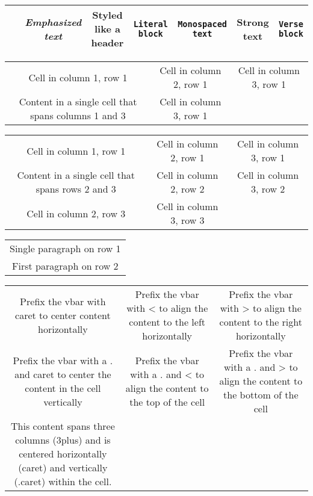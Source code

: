 \begin{center}
\begin{tabular}{|c|c|c|c|c|c|c|}
\hline
\ & \emph{Emphasized text} & Styled like a header & \texttt{Literal block} & \texttt{Monospaced text} & \textbf{Strong text} & \texttt{Verse block} \\
\hline
\end{tabular}
\end{center}

\begin{center}
\begin{tabular}{|c|c|c|}
\hline
Cell in column 1, row 1 & Cell in column 2, row 1 & Cell in column 3, row 1 \\
Content in a single cell that spans columns 1 and 3 & Cell in column 3, row 1 \\
\hline
\end{tabular}
\end{center}

\begin{center}
\begin{tabular}{|c|c|c|}
\hline
Cell in column 1, row 1 & Cell in column 2, row 1 & Cell in column 3, row 1 \\
Content in a single cell that spans rows 2 and 3 & Cell in column 2, row 2 & Cell in column 3, row 2 \\
Cell in column 2, row 3 & Cell in column 3, row 3 \\
\hline
\end{tabular}
\end{center}

\begin{center}
\begin{tabular}{|c|}
\hline
Single paragraph on row 1 \\
First paragraph on row 2
\\
\hline
\end{tabular}
\end{center}

\begin{center}
\begin{tabular}{|c|c|c|}
\hline
Prefix the {vbar} with {caret} to center content horizontally & Prefix the {vbar} with < to align the content to the left horizontally & Prefix the {vbar} with > to align the content to the right horizontally \\
Prefix the {vbar} with a . and {caret} to center the content in the cell vertically & Prefix the {vbar} with a . and < to align the content to the top of the cell & Prefix the {vbar} with a . and > to align the content to the bottom of the cell \\
This content spans three columns (3{plus}) and is centered horizontally ({caret}) and vertically (.{caret}) within the cell. \\
\hline
\end{tabular}
\end{center}

